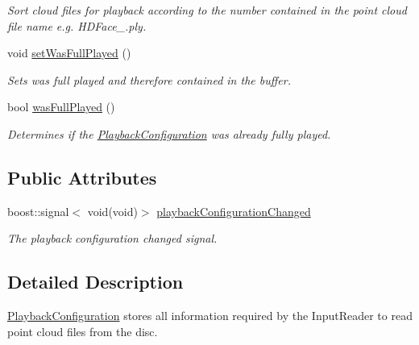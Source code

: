\begin{DoxyCompactItemize}
\begin{DoxyCompactList}\small\item\em Sort cloud files for playback according to the number contained in the point cloud file name e.\+g. H\+D\+Face\+\_.\+ply. \end{DoxyCompactList}\item 
\hypertarget{class_playback_configuration_ac91b75c0d9b8b741a437e8d33fc87b95}{}void \hyperlink{class_playback_configuration_ac91b75c0d9b8b741a437e8d33fc87b95}{set\+Was\+Full\+Played} ()\label{class_playback_configuration_ac91b75c0d9b8b741a437e8d33fc87b95}

\begin{DoxyCompactList}\small\item\em Sets was full played and therefore contained in the buffer. \end{DoxyCompactList}\item 
bool \hyperlink{class_playback_configuration_ad72e7749e52c1495ecc9408bb6c97542}{was\+Full\+Played} ()
\begin{DoxyCompactList}\small\item\em Determines if the \hyperlink{class_playback_configuration}{Playback\+Configuration} was already fully played. \end{DoxyCompactList}\end{DoxyCompactItemize}
\subsection*{Public Attributes}
\begin{DoxyCompactItemize}
\item 
\hypertarget{class_playback_configuration_a69b5496bdebf38fe5727fb96ccf4f40c}{}boost\+::signal$<$ void(void)$>$ \hyperlink{class_playback_configuration_a69b5496bdebf38fe5727fb96ccf4f40c}{playback\+Configuration\+Changed}\label{class_playback_configuration_a69b5496bdebf38fe5727fb96ccf4f40c}

\begin{DoxyCompactList}\small\item\em The playback configuration changed signal. \end{DoxyCompactList}\end{DoxyCompactItemize}


\subsection{Detailed Description}
\hyperlink{class_playback_configuration}{Playback\+Configuration} stores all information required by the Input\+Reader to read point cloud files from the disc. 


